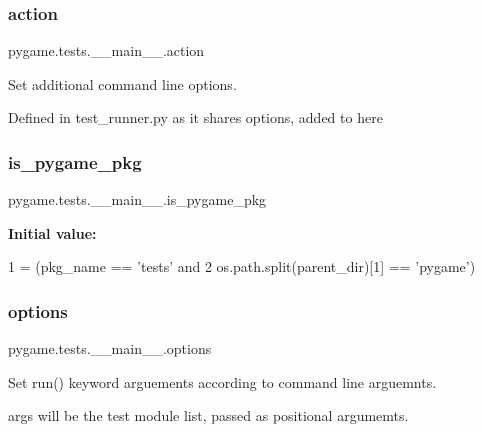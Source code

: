 \subsubsection{\texorpdfstring{action}{action}}
{\footnotesize\ttfamily pygame.\+tests.\+\_\+\+\_\+main\+\_\+\+\_\+.\+action}



Set additional command line options. 

Defined in test\+\_\+runner.\+py as it shares options, added to here \mbox{\label{namespacepygame_1_1tests_1_1____main_____a6062e63de4f7fede225043ac40f8134b}} 
\subsubsection{\texorpdfstring{is\+\_\+pygame\+\_\+pkg}{is\_pygame\_pkg}}
{\footnotesize\ttfamily pygame.\+tests.\+\_\+\+\_\+main\+\_\+\+\_\+.\+is\+\_\+pygame\+\_\+pkg}

{\bfseries Initial value\+:}
\begin{DoxyCode}
1 =  (pkg\_name == \textcolor{stringliteral}{'tests'} \textcolor{keywordflow}{and}
2                      os.path.split(parent\_dir)[1] == \textcolor{stringliteral}{'pygame'})
\end{DoxyCode}
\mbox{\label{namespacepygame_1_1tests_1_1____main_____afb8ede7be60bf8d9392a0332432c16c1}} 
\subsubsection{\texorpdfstring{options}{options}}
{\footnotesize\ttfamily pygame.\+tests.\+\_\+\+\_\+main\+\_\+\+\_\+.\+options}



Set run() keyword arguements according to command line arguemnts. 

args will be the test module list, passed as positional argumemts. 
